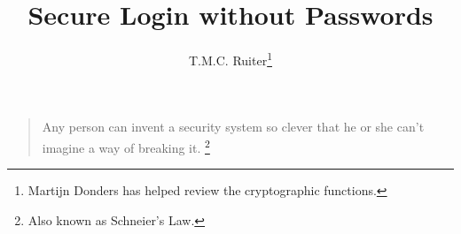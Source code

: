\documentclass[a4paper]{article}%
\title{Secure Login without Passwords}
\author{T.M.C. Ruiter\thanks{Martijn Donders has helped review the cryptographic functions.}}
\begin{document}
\maketitle
\begin{quote}
Any person can invent a security system so clever that he or she can't imagine a way of breaking it.%
\footnote{Also known as Schneier's Law.}
\end{quote}

\tableofcontents









\end{document}
